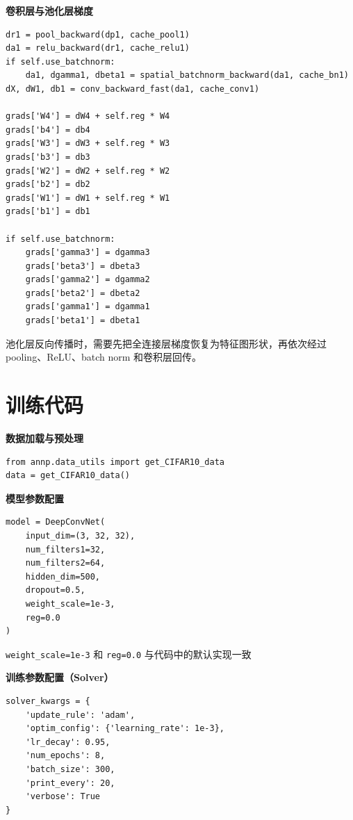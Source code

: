 \textbf{卷积层与池化层梯度}

\begin{lstlisting}[style=cleanpython]
dr1 = pool_backward(dp1, cache_pool1)
da1 = relu_backward(dr1, cache_relu1)
if self.use_batchnorm:
    da1, dgamma1, dbeta1 = spatial_batchnorm_backward(da1, cache_bn1)
dX, dW1, db1 = conv_backward_fast(da1, cache_conv1)

grads['W4'] = dW4 + self.reg * W4
grads['b4'] = db4
grads['W3'] = dW3 + self.reg * W3
grads['b3'] = db3
grads['W2'] = dW2 + self.reg * W2
grads['b2'] = db2
grads['W1'] = dW1 + self.reg * W1
grads['b1'] = db1

if self.use_batchnorm:
    grads['gamma3'] = dgamma3
    grads['beta3'] = dbeta3
    grads['gamma2'] = dgamma2
    grads['beta2'] = dbeta2
    grads['gamma1'] = dgamma1
    grads['beta1'] = dbeta1
\end{lstlisting}

池化层反向传播时，需要先把全连接层梯度恢复为特征图形状，再依次经过 pooling、ReLU、batch norm 和卷积层回传。

\section{训练代码}

\textbf{数据加载与预处理}

\begin{lstlisting}[style=cleanpython]
from annp.data_utils import get_CIFAR10_data
data = get_CIFAR10_data()
\end{lstlisting}

\textbf{模型参数配置}

\begin{lstlisting}[style=cleanpython]
model = DeepConvNet(
    input_dim=(3, 32, 32),
    num_filters1=32,
    num_filters2=64,
    hidden_dim=500,
    dropout=0.5,
    weight_scale=1e-3,
    reg=0.0
)
\end{lstlisting}

\lstinline|weight_scale=1e-3| 和 \lstinline|reg=0.0| 与代码中的默认实现一致

\textbf{训练参数配置（Solver）}

\begin{lstlisting}[style=cleanpython]
solver_kwargs = {
    'update_rule': 'adam',
    'optim_config': {'learning_rate': 1e-3},
    'lr_decay': 0.95,
    'num_epochs': 8,
    'batch_size': 300,
    'print_every': 20,
    'verbose': True
}
\end{lstlisting}

